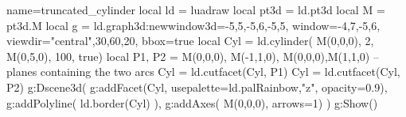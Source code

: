 \documentclass[border=5pt]{standalone}%
\begin{document}
\begin{luadraw}{name=truncated_cylinder}
local ld = luadraw
local pt3d = ld.pt3d
local M = pt3d.M
local g = ld.graph3d:new{window3d={-5,5,-5,6,-5,5}, window={-4,7,-5,6}, 
    viewdir={"central",30,60,20}, bbox=true}
local Cyl = ld.cylinder( M(0,0,0), 2, M(0,5,0), 100, true)
local P1, P2 = {M(0,0,0), M(-1,1,0)}, {M(0,0,0),M(1,1,0)} -- planes containing the two arcs
Cyl = ld.cutfacet(Cyl, P1)
Cyl = ld.cutfacet(Cyl, P2)
g:Dscene3d( 
    g:addFacet(Cyl, {usepalette={ld.palRainbow,"z"}, opacity=0.9}),
    g:addPolyline( ld.border(Cyl) ),
    g:addAxes( M(0,0,0), {arrows=1})  )
g:Show()
\end{luadraw}
\end{document}
